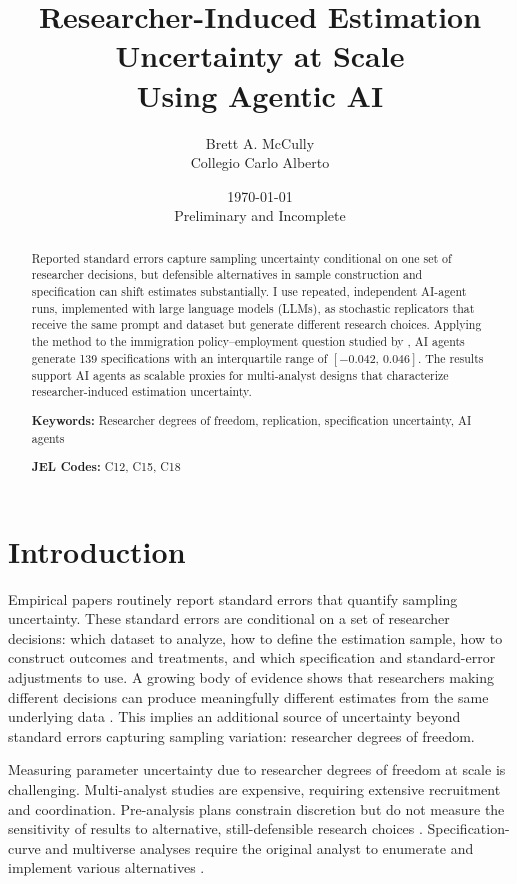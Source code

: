 \documentclass[12pt]{article}
\title{Researcher-Induced Estimation Uncertainty at Scale\\Using Agentic AI}
\author{
Brett A. McCully\\ \small Collegio Carlo Alberto
}
\date{\today \\ \vspace{0.5em} \small Preliminary and Incomplete}
\begin{document}
\maketitle

\begin{abstract}
Reported standard errors capture sampling uncertainty conditional on one set of researcher decisions, but defensible alternatives in sample construction and specification can shift estimates substantially. I use repeated, independent AI-agent runs, implemented with large language models (LLMs), as stochastic replicators that receive the same prompt and dataset but generate different research choices. Applying the method to the immigration policy--employment question studied by \citet{huntingtonklein2025sources}, AI agents generate 139 specifications with an interquartile range of $[-0.042,\, 0.046]$. The results support AI agents as scalable proxies for multi-analyst designs that characterize researcher-induced estimation uncertainty.

\medskip
\noindent \textbf{Keywords:} Researcher degrees of freedom, replication, specification uncertainty, AI agents

\medskip
\noindent \textbf{JEL Codes:} C12, C15, C18
\end{abstract}

\newpage

\section{Introduction}
\label{sec:intro}

Empirical papers routinely report standard errors that quantify sampling uncertainty. These standard errors are conditional on a set of researcher decisions: which dataset to analyze, how to define the estimation sample, how to construct outcomes and treatments, and which specification and standard-error adjustments to use. A growing body of evidence shows that researchers making different  decisions can produce meaningfully different estimates from the same underlying data \citep{silberzahn2018many, huntington2021influence, breznau2022observing}. This implies an additional source of uncertainty beyond standard errors capturing sampling variation: researcher degrees of freedom.

Measuring parameter uncertainty due to researcher degrees of freedom at scale is challenging. Multi-analyst studies are expensive, requiring extensive recruitment and coordination. Pre-analysis plans constrain discretion but do not measure the sensitivity of results to alternative, still-defensible research choices \citep{olken2015promises}. Specification-curve and multiverse analyses require the original analyst to enumerate and implement various alternatives \citep{simonsohn2020specification, steegen2016multiverse}.
\end{document}
